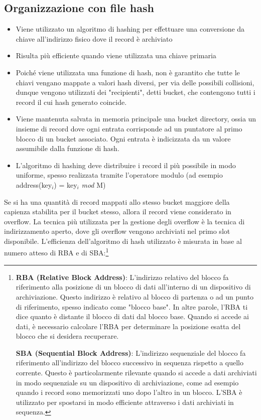 \documentclass{article}
\begin{document}
\subsection{Organizzazione con file hash}
\begin{itemize}
  \item Viene utilizzato un algoritmo di hashing per effettuare una conversione da chiave all'indirizzo fisico dove il record è archiviato
  \item Risulta più efficiente quando viene utilizzata una chiave primaria
  \item Poiché viene utilizzata una funzione di hash, non è garantito che tutte le chiavi vengano mappate a valori hash diversi, per via delle possibili collisioni, dunque vengono utilizzati dei "recipienti", detti bucket, che contengono tutti i record il cui hash generato coincide.
  \item Viene mantenuta salvata in memoria principale una bucket directory, ossia un insieme di record dove ogni entrata corrisponde ad un puntatore al primo blocco di un bucket associato. Ogni entrata è indicizzata da un valore assumibile dalla funzione di hash.
  \item L'algoritmo di hashing deve distribuire i record il più possibile in modo uniforme, spesso realizzata tramite l'operatore modulo (ad esempio address(key$_i$) = key$_i$ \textit{mod} M)
  
\end{itemize}
Se si ha una quantità di record mappati allo stesso bucket maggiore della capienza stabilita per il bucket stesso, allora il record viene considerato in overflow. La tecnica più utilizzata per la gestione degli overflow è la tecnica di indirizzamento aperto, dove gli overflow vengono archiviati nel primo slot disponibile. 
L'efficienza dell'algoritmo di hash utilizzato è misurata in base al numero atteso di RBA e di SBA:\footnote{\textbf{RBA (Relative Block Address)}: L'indirizzo relativo del blocco fa riferimento alla posizione di un blocco di dati all'interno di un dispositivo di archiviazione. Questo indirizzo è relativo al blocco di partenza o ad un punto di riferimento, spesso indicato come "blocco base". In altre parole, l'RBA ti dice quanto è distante il blocco di dati dal blocco base. Quando si accede ai dati, è necessario calcolare l'RBA per determinare la posizione esatta del blocco che si desidera recuperare.

\textbf{SBA (Sequential Block Address)}: L'indirizzo sequenziale del blocco fa riferimento all'indirizzo del blocco successivo in sequenza rispetto a quello corrente. Questo è particolarmente rilevante quando si accede a dati archiviati in modo sequenziale su un dispositivo di archiviazione, come ad esempio quando i record sono memorizzati uno dopo l'altro in un blocco. L'SBA è utilizzato per spostarsi in modo efficiente attraverso i dati archiviati in sequenza.}
\end{document}
